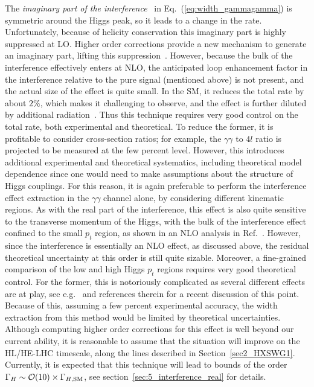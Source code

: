 The \emph{imaginary part of the interference}~\cite{Dixon:2013haa,Campbell:2017rke} 
in Eq.~(\ref{eq:width_gammagamma})
is symmetric around the Higgs peak, so it leads to a change in the rate. Unfortunately,
because of helicity conservation this imaginary part is highly suppressed at LO.
Higher order corrections provide a new mechanism to generate an imaginary part, lifting this suppression~\cite{Dixon:2013haa}.
However, because the bulk of the interference effectively enters at NLO,
the anticipated loop enhancement factor in the interference relative to the pure signal (mentioned above)
is not present, and the actual size of the effect is quite small. In the SM, 
it reduces the total rate by
about $2\%$, 
which makes it challenging to observe, and the effect is further diluted 
by additional radiation~\cite{Campbell:2017rke}. Thus this technique requires very good
control on the total rate, both experimental and theoretical. To reduce the former, it is 
profitable to consider cross-section ratios; for example, the $\gamma\gamma$ to $4l$ ratio
is projected to be measured at the few percent level.
However, this introduces additional experimental and theoretical systematics, including 
theoretical model dependence since one would need to make assumptions about the structure of Higgs 
couplings.
For this reason, it is again preferable to perform the interference effect extraction in 
the $\gamma\gamma$ channel alone,
by considering different kinematic regions.
%
As with the real part of the interference,  this effect is also quite sensitive to the transverse momentum of the Higgs, with the bulk of the interference effect confined to the small $p_t$ region, as shown in an NLO analysis in Ref.~\cite{Campbell:2017rke}. However, since the interference is essentially an NLO effect, as discussed above,  the residual theoretical uncertainty at this order is still quite sizable. Moreover, a fine-grained comparison of the low and high 
Higgs $p_t$ regions requires very good theoretical control. For the former, this is notoriously
complicated as several different effects are at play, see e.g.~\cite{Caola:2018zye} and references 
therein for a recent discussion of this point. Because of this, 
assuming a few percent experimental accuracy, the width extraction from this method would be
limited by theoretical uncertainties. Although computing higher order corrections for this
effect is well beyond our current ability, it is reasonable to assume that the situation
will improve on the HL/HE-LHC timescale, along the lines described in Section~\ref{sec2_HXSWG1}.
Currently, it is expected that this technique will lead to bounds of the order
${\Gamma_H} \sim \mathcal O(10)\times {\Gamma_{H,{\rm SM}}}$, see section~\ref{sec:5_interference_real} for details. 

